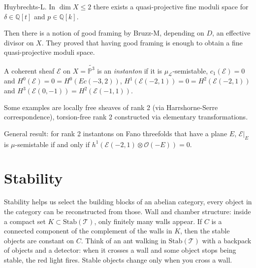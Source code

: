 \documentclass{book}
\begin{document}
\noindent
Huybrechts-L. In $\dim X\leq 2$
there exists a quasi-projective fine moduli
space
for $\delta \in \mathbb{Q}[t]$ and $p \in
\mathbb{Q}[k]$.

\medskip\noindent
Then there is a notion of good framing by
Bruzz-M,
depending on $D$, an effective divisor on
$X$.
They proved that having good framing is
enough
to obtain a fine quasi-projective moduli
space.

\begin{definition}
\label{definition-instanton}
A coherent sheaf $\mathcal{E}$ on
$X=\tilde{\mathbb{P}^3}$
is an {\it instanton} if it is
$\mu_{\mathcal{L}}$-semistable,
$c_1(\mathcal{E})=0$ and
$H^0(\mathcal{E})=0=H^0(Ec(-3,2))$,
$H^1(\mathcal{E}(-2,1))=0=H^2(\mathcal{E}(-2,
1))$
and
$H^3(\mathcal{E}(0,-1))=H^2(\mathcal{E}(-1,1)
)$.
\end{definition}

\noindent
Some examples are locally free sheaves of
rank 2 (via Harrshorne-Serre
correspondence),
torsion-free rank 2 constructed via
elementary
transformations.

\medskip\noindent
General result: for rank 2 instantons on Fano
threefolds
that have a plane $E$,
$\mathcal{E}|_{E}$ is $\mu$-semistable
if and only if $h^1(\mathcal{E}(-2,1) \otimes
\mathcal{O}(-E))=0$.




\section{Stability}
\label{section-stability}

\noindent
Stability helps us select the
building blocks of an abelian
category, every object in the
category can be reconstructed
from those.
Wall and chamber structure: inside a
compact set $K \subset
\text{Stab}(\mathcal{T})$,
only finitely many walls appear.
If $C$ is a connected component of
the complement of the walls in $K$,
then the stable objects are constant
on $C$.
Think of an ant walking in
$\text{Stab}(\mathcal{T})$ with a
backpack of objects and a detector:
when it crosses a wall and some object
stops being stable, the red light fires.
Stable objects change only when you
cross a wall.
\end{document}
